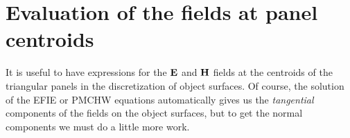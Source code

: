 \newpage
\section{Evaluation of the fields at panel centroids}

It is useful to have expressions for the $\mathbf{E}$ and $\mathbf{H}$
fields at the centroids of the triangular panels in the
discretization of object surfaces. Of course, the solution 
of the EFIE or PMCHW equations automatically gives us the 
\textit{tangential} components of the fields on the object
surfaces, but to get the normal components we must do a little
more work. 

